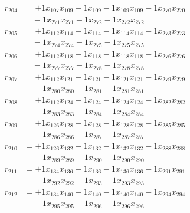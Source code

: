 \[\begin{aligned}
r_{204} &= + 1 x_{107} x_{109} - 1 x_{109} - 1 x_{109} x_{109} - 1 x_{270} x_{270} \\
 &\quad - 1 x_{271} x_{271} - 1 x_{272} - 1 x_{272} x_{272}
\end{aligned}\]
\[\begin{aligned}
r_{205} &= + 1 x_{112} x_{114} - 1 x_{114} - 1 x_{114} x_{114} - 1 x_{273} x_{273} \\
 &\quad - 1 x_{274} x_{274} - 1 x_{275} - 1 x_{275} x_{275}
\end{aligned}\]
\[\begin{aligned}
r_{206} &= + 1 x_{112} x_{118} - 1 x_{118} - 1 x_{118} x_{118} - 1 x_{276} x_{276} \\
 &\quad - 1 x_{277} x_{277} - 1 x_{278} - 1 x_{278} x_{278}
\end{aligned}\]
\[\begin{aligned}
r_{207} &= + 1 x_{112} x_{121} - 1 x_{121} - 1 x_{121} x_{121} - 1 x_{279} x_{279} \\
 &\quad - 1 x_{280} x_{280} - 1 x_{281} - 1 x_{281} x_{281}
\end{aligned}\]
\[\begin{aligned}
r_{208} &= + 1 x_{112} x_{124} - 1 x_{124} - 1 x_{124} x_{124} - 1 x_{282} x_{282} \\
 &\quad - 1 x_{283} x_{283} - 1 x_{284} - 1 x_{284} x_{284}
\end{aligned}\]
\[\begin{aligned}
r_{209} &= + 1 x_{126} x_{128} - 1 x_{128} - 1 x_{128} x_{128} - 1 x_{285} x_{285} \\
 &\quad - 1 x_{286} x_{286} - 1 x_{287} - 1 x_{287} x_{287}
\end{aligned}\]
\[\begin{aligned}
r_{210} &= + 1 x_{126} x_{132} - 1 x_{132} - 1 x_{132} x_{132} - 1 x_{288} x_{288} \\
 &\quad - 1 x_{289} x_{289} - 1 x_{290} - 1 x_{290} x_{290}
\end{aligned}\]
\[\begin{aligned}
r_{211} &= + 1 x_{134} x_{136} - 1 x_{136} - 1 x_{136} x_{136} - 1 x_{291} x_{291} \\
 &\quad - 1 x_{292} x_{292} - 1 x_{293} - 1 x_{293} x_{293}
\end{aligned}\]
\[\begin{aligned}
r_{212} &= + 1 x_{134} x_{140} - 1 x_{140} - 1 x_{140} x_{140} - 1 x_{294} x_{294} \\
 &\quad - 1 x_{295} x_{295} - 1 x_{296} - 1 x_{296} x_{296}
\end{aligned}\]
